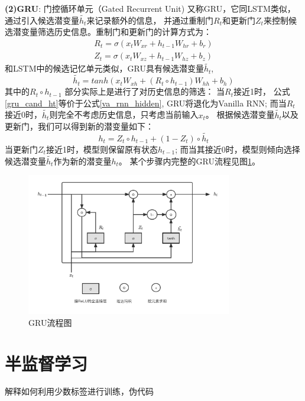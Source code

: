       \textbf{(2)GRU}: 门控循环单元（Gated Recurrent Unit) 又称GRU，它同LSTM类似，
      通过引入候选潜变量$\tilde{h_t}$来记录额外的信息，
      并通过重制门$R_t$和更新门$Z_t$来控制候选潜变量筛选历史信息。重制门和更新门的计算方式为：
      \begin{align}
        R_t = \sigma(x_t W_{xr} + h_{t-1} W_{hr} + b_r) \\
        Z_t = \sigma(x_t W_{xz} + h_{t-1} W_{hz} + b_z) 
      \end{align}
      和LSTM中的候选记忆单元类似，GRU具有候选潜变量$\tilde{h_t}$,
      \begin{equation} \label{gru_cand_ht}
        \tilde{h_t} = tanh(x_t W_{xh} + (R_t \circ h_{t-1})W_{hh} + b_h)
      \end{equation}
      其中的$R_t \circ h_{t-1}$ 部分实际上是进行了对历史信息的筛选：
      当$R_t$接近1时， 公式\ref{gru_cand_ht}等价于公式\ref{va_rnn_hidden},
      GRU将退化为Vanilla RNN;
      而当$R_t$接近0时，$\tilde{h_t}$则完全不考虑历史信息，只考虑当前输入$x_t$。
      根据候选潜变量$\tilde{h_t}$以及更新门，我们可以得到新的潜变量如下：
      \begin{equation} \label{gru_ht}
        h_t = Z_t \circ h_{t-1} + (1-Z_t)\circ \tilde{h_t}
      \end{equation}
      当更新门$Z_t$接近1时，模型则保留原有状态$h_{t-1}$;
      而当其接近0时，模型则倾向选择候选潜变量$\tilde{h_t}$作为新的潜变量$h_t$。
      某个步骤内完整的GRU流程见图\ref{pic:gru}。
      \begin{figure}[htbp]
      \centering
      \includegraphics[width=0.8\textwidth]{Figures/GRU.png}
      \caption{GRU流程图}
      \label{pic:gru}
    \end{figure}
  \section{半监督学习}解释如何利用少数标签进行训练，伪代码

